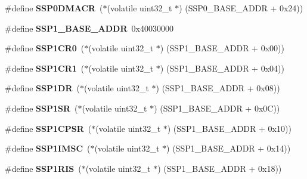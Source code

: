 \begin{DoxyCompactItemize}
\#define {\bfseries S\+S\+P0\+D\+M\+A\+CR}~($\ast$(volatile uint32\+\_\+t $\ast$) (S\+S\+P0\+\_\+\+B\+A\+S\+E\+\_\+\+A\+D\+DR + 0x24))
\item 
\mbox{\label{group__lpc24xx__regs_ga412646742b338f8d774f21b8c016adeb}} 
\#define {\bfseries S\+S\+P1\+\_\+\+B\+A\+S\+E\+\_\+\+A\+D\+DR}~0x40030000
\item 
\mbox{\label{group__lpc24xx__regs_ga0dd2f12ced738e84672fe19b1c0f13d2}} 
\#define {\bfseries S\+S\+P1\+C\+R0}~($\ast$(volatile uint32\+\_\+t $\ast$) (S\+S\+P1\+\_\+\+B\+A\+S\+E\+\_\+\+A\+D\+DR + 0x00))
\item 
\mbox{\label{group__lpc24xx__regs_ga07ec57baa0581a21b7dce1c24e4222b8}} 
\#define {\bfseries S\+S\+P1\+C\+R1}~($\ast$(volatile uint32\+\_\+t $\ast$) (S\+S\+P1\+\_\+\+B\+A\+S\+E\+\_\+\+A\+D\+DR + 0x04))
\item 
\mbox{\label{group__lpc24xx__regs_gaceb33b7fc340bfd45932acf8d2da06ce}} 
\#define {\bfseries S\+S\+P1\+DR}~($\ast$(volatile uint32\+\_\+t $\ast$) (S\+S\+P1\+\_\+\+B\+A\+S\+E\+\_\+\+A\+D\+DR + 0x08))
\item 
\mbox{\label{group__lpc24xx__regs_ga84f1918ddb556e2d68952ff6e6047a49}} 
\#define {\bfseries S\+S\+P1\+SR}~($\ast$(volatile uint32\+\_\+t $\ast$) (S\+S\+P1\+\_\+\+B\+A\+S\+E\+\_\+\+A\+D\+DR + 0x0\+C))
\item 
\mbox{\label{group__lpc24xx__regs_gaff7a3b4b2db9031d48fc1748be4d50de}} 
\#define {\bfseries S\+S\+P1\+C\+P\+SR}~($\ast$(volatile uint32\+\_\+t $\ast$) (S\+S\+P1\+\_\+\+B\+A\+S\+E\+\_\+\+A\+D\+DR + 0x10))
\item 
\mbox{\label{group__lpc24xx__regs_ga58edb9011bd8a76113ffd5fcf55413db}} 
\#define {\bfseries S\+S\+P1\+I\+M\+SC}~($\ast$(volatile uint32\+\_\+t $\ast$) (S\+S\+P1\+\_\+\+B\+A\+S\+E\+\_\+\+A\+D\+DR + 0x14))
\item 
\mbox{\label{group__lpc24xx__regs_ga8a1cd6e5114cb6e81b1661ce02127124}} 
\#define {\bfseries S\+S\+P1\+R\+IS}~($\ast$(volatile uint32\+\_\+t $\ast$) (S\+S\+P1\+\_\+\+B\+A\+S\+E\+\_\+\+A\+D\+DR + 0x18))

\end{DoxyCompactItemize}

